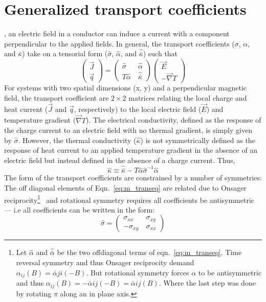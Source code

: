 \section{Generalized transport coefficients}
, an electric field in a conductor can induce a current with a component perpendicular to the applied fields. In general, the transport coefficients ($\sigma$, $\alpha$, and $\bar\kappa$) take on a tensorial form ($\hat\sigma$, $\hat\alpha$, and $\hat{\bar\kappa}$) such that
\begin{equation}
\left( \begin{array}{c} \vec J  \\ \vec q \end{array}\right) =  \left( \begin{array}{cc} \hat\sigma   &\  \hat\alpha \\  T\hat\alpha   &\ \hat{\bar\kappa}  \end{array}\right)\left( \begin{array}{c}  \vec E \\  -\vec\nabla T  \end{array}\right)   \label{eq:m_transeq}
\end{equation}
For systems with two spatial dimensions (x, y) and a perpendicular magnetic field, the transport coefficient are $2\times 2$ matrices relating the local charge and heat current ($\vec J$ and $\vec q$, respectively) to the local electric field ($\vec E$) and temperature gradient ($\vec\nabla T$). The electrical conductivity, defined as the response of the charge current to an electric field with no thermal gradient, is simply given by $\hat\sigma$. However, the thermal conductivity ($\hat\kappa$) is not symmetrically defined as the response of heat current to an applied temperature gradient in the absence of an electric field but instead defined in the absence of a charge current. Thus,
\begin{equation}
\hat\kappa \equiv \hat{\bar\kappa}-T\hat\alpha\hat\sigma^{-1}\hat\alpha
\end{equation}
The form of the transport coefficients are constrained by a number of symmetries: The off diagonal elements of Eqn.~\ref{eq:m_transeq} are related due to Onsager reciprocity\footnote{Let $\hat\alpha$ and $\hat{\bar\alpha}$ be the two offdiagonal terms of eqn.~\ref{eq:m_transeq}. Time reversal symmetry and thus Onsager reciprocity demand ${\alpha_{ij}(B)=\bar\alpha{ji}(-B)}$. But rotational symmetry forces $\alpha$ to be antisymmetric and thus ${\alpha_{ij}(B)=-\bar\alpha{ij}(-B)=\bar\alpha{ij}(B)}$. Where the last step was done by rotating $\pi$ along an in plane axis.}~\cite{mazur_onsagers_1953, smrcka_transport_1977} and rotational symmetry requires all coefficients be antisymmetric --- i.e all coefficients can be written in the form:
\begin{equation}
\hat\sigma=\left( \begin{array}{cc} \sigma_{xx}  &\  \sigma_{xy} \\ -\sigma_{xy}  &\ \sigma_{xx} \end{array}\right)
\end{equation}

